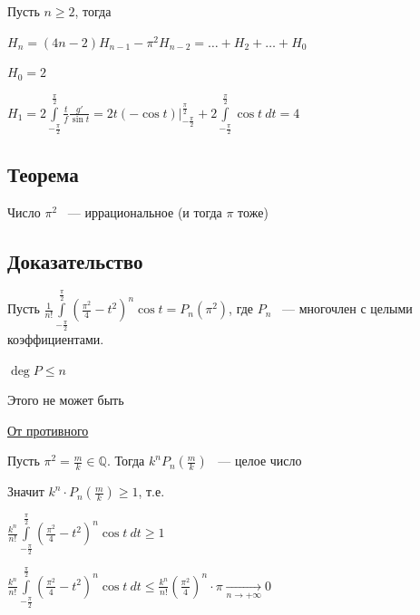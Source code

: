 \documentclass{article}
\begin{document}
			Пусть $n \geq 2$, тогда
			
			$H_n = (4n - 2) H_{n - 1} - \pi^2 H_{n - 2} = \ldots + H_2 + \ldots + H_0$
			
			$H_0 = 2$
			
			$H_1 = 2 \int\limits^{\frac{\pi}{2}}_{-\frac{\pi}{2}} \frac{t}{f} \frac{g'}{\sin t} = 2t (- \cos t)\bigg|^{\frac{\pi}{2}}_{-\frac{\pi}{2}} + 2 \int\limits^{\frac{\pi}{2}}_{-\frac{\pi}{2}} \cos t \ dt = 4$
			
		\subsection{Теорема}
		
			Число $\pi^2$ ~--- иррациональное (и тогда $\pi$ тоже)
			
		\subsection{Доказательство}
		
			Пусть $\frac{1}{n!} \int\limits^{\frac{\pi}{2}}_{-\frac{\pi}{2}} (\frac{\pi^2}{4} - t^2)^n \cos t = P_n (\pi^2)$, где $P_n$ ~--- многочлен с целыми коэффициентами.
			
			$\deg P \leq n$
			
			Этого не может быть
			
			\underline{От противного}
			
			Пусть $\pi^2 = \frac{m}{k} \in \mathbb{Q}$. Тогда $k^n P_n(\frac{m}{k})$ ~--- целое число
			
			Значит $k^n \cdot P_n (\frac{m}{k}) \geq 1$, т.е.
			
			$\frac{k^n}{n!} \int\limits^{\frac{\pi}{2}}_{-\frac{\pi}{2}} (\frac{\pi^2}{4} - t^2)^n \cos t \ dt \geq 1$
			
			$\frac{k^n}{n!} \int\limits^{\frac{\pi}{2}}_{-\frac{\pi}{2}} (\frac{\pi^2}{4} - t^2)^n \cos t \ dt \leq \frac{k^n}{n!} (\frac{\pi^2}{4})^n \cdot \pi \xrightarrow[n \rightarrow +\infty]{} 0$
			
			
			 
			
\end{document}
